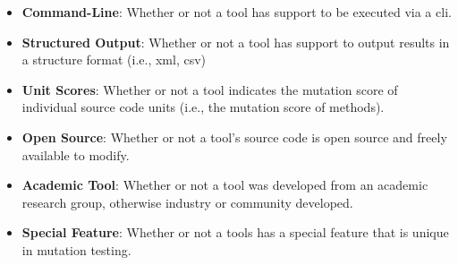 \begin{itemize}
  \item \textbf{Command-Line}: Whether or not a tool has support to be executed via a \gls{cli}.
  \item \textbf{Structured Output}: Whether or not a tool has support to output results in a structure format (i.e., \gls{xml}, \gls{csv})
  \item \textbf{Unit Scores}: Whether or not a tool indicates the mutation score of individual source code units (i.e., the mutation score of methods).
  \item \textbf{Open Source}: Whether or not a tool's source code is open source and freely available to modify.
  \item \textbf{Academic Tool}: Whether or not a tool was developed from an academic research group, otherwise industry or community developed.
  \item \textbf{Special Feature}: Whether or not a tools has a special feature that is unique in mutation testing.
\end{itemize}

